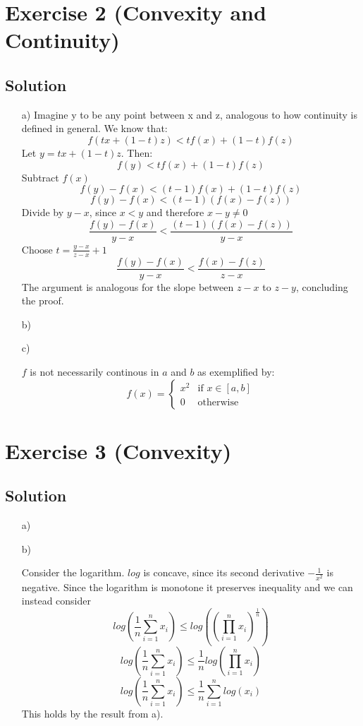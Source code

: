 \documentclass[10pt]{article}
\numberwithin{equation}{section}
\begin{document}
\section*{Exercise 2 (Convexity and Continuity)}

\subsection*{Solution}
\begin{enumerate}
\item[a)]{
    Imagine y to be any point between x and z, analogous to how continuity is defined in general.
    We know that:
    $$f(tx + (1-t)z) < tf(x) + (1-t)f(z)$$
    Let $y = tx + (1-t)z$. Then:
    $$ f(y) < tf(x) + (1-t)f(z)$$ 
    Subtract $f(x)$
    $$ f(y) - f(x) < (t-1)f(x) + (1-t)f(z)$$
    $$ f(y) - f(x) < (t-1)(f(x) - f(z))$$
    Divide by $y-x$, since $x < y$ and therefore $x-y \neq 0$
    $$ \frac{f(y) - f(x)}{y-x} < \frac{(t-1)(f(x) - f(z))}{y-x}$$
    Choose $t = \frac{y-x}{z-x} +1$
    $$ \frac{f(y) - f(x)}{y-x} < \frac{f(x) - f(z)}{z-x}$$
    The argument is analogous for the slope between $z-x$ to $z-y$, concluding the proof.
}
\item[b)]{

}
\item[c)]{
    $f$ is not necessarily continous in $a$ and $b$ as exemplified by:
    $$f(x) = 
    \begin{cases}
      x^2 & \text{if } x \in [a,b]\\
      0 & \text{otherwise}
    \end{cases}
    $$

  }

\end{enumerate}

\section*{Exercise 3 (Convexity)}
\subsection*{Solution}

\begin{enumerate}
\item[a)]{

}
\item[b)]{
    Consider the logarithm. $log$ is concave, since its second derivative $-\frac{1}{x^2}$ is negative.
    Since the logarithm is monotone it preserves inequality and we can instead consider
    $$log(\frac{1}{n} \sum_{i=1}^{n}x_i) \leq log((\prod_{i=1}^n x_i)^{\frac{1}{n}})$$
    $$log(\frac{1}{n} \sum_{i=1}^{n}x_i) \leq \frac{1}{n} log(\prod_{i=1}^n x_i)$$
    $$log(\frac{1}{n} \sum_{i=1}^{n}x_i) \leq \frac{1}{n} \sum_{i=1}^n log(x_i)$$
    This holds by the result from a).

}
\end{enumerate}
\end{document}
